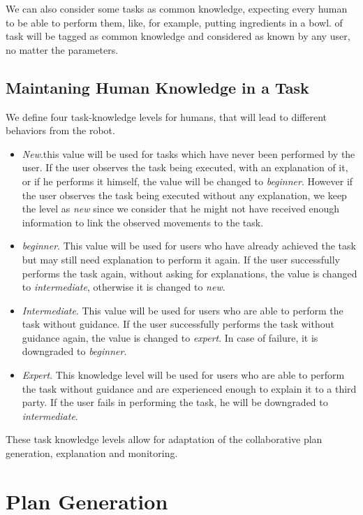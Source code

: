 We can also consider some tasks as common knowledge, expecting every human to be able to perform them, like, for example, putting ingredients in a bowl. of task will be tagged as common knowledge and considered as known by any user, no matter the parameters. 

\subsection{Maintaning Human Knowledge in a Task}
We define four task-knowledge levels for humans, that will lead to different behaviors from the robot.

\begin{itemize}
\item \textit{New}.this value will be used for tasks which have never been performed by the user. If the user observes the task being executed, with an explanation of it, or if he performs it himself, the value will be changed to \textit{beginner}. However if the user observes the task being executed without any explanation, we  keep the level as \textit{new} since we consider that he might not have received enough information to link the observed movements to the task.
\item \textit{beginner}. This value will be used for users who have already achieved the task but may still need explanation to perform it again. If the user successfully performs the task again, without asking for explanations, the value is changed to \textit{intermediate}, otherwise it is changed to \textit{new}.
\item \textit{Intermediate}. This value will be used for users who are able to perform the task without guidance. If the user successfully performs the task without guidance again, the value is changed to \textit{expert}. In case of failure, it is downgraded to \textit{beginner}.
\item \textit{Expert}. This knowledge level will be used for users who are able to perform the task without guidance and are experienced enough to explain it to a third party. If the user fails in performing the task, he will be downgraded to \textit{intermediate}.
\end{itemize}

These task knowledge levels allow for adaptation of the collaborative plan generation, explanation and monitoring.


\section{Plan Generation}
\label{sec-plan_management-plan_generation}
